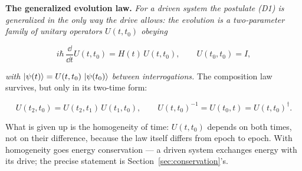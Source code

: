 \medskip\noindent\textbf{The generalized evolution law.} \emph{For a driven system the postulate \textup{(D1)} is generalized in the only way the drive allows: the evolution is a two-parameter family of unitary operators $U(t, t_0)$ obeying}
\begin{linenomath}
    \begin{equation}
        i\hbar\,\frac{\dd}{\dd t}U(t, t_0) = H(t)\,U(t, t_0), \qquad U(t_0, t_0) = I,
        \label{eq:schroedinger-timedep}
    \end{equation}
\end{linenomath}
\emph{with $\ket{\psi(t)} = U(t, t_0)\,\ket{\psi(t_0)}$ between interrogations.} The composition law survives, but only in its two-time form:
\begin{linenomath}
    \begin{equation*}
        U(t_2, t_0) = U(t_2, t_1)\,U(t_1, t_0), \qquad U(t, t_0)^{-1} = U(t_0, t) = U(t, t_0)^\dagger .
    \end{equation*}
\end{linenomath}
What is given up is the homogeneity of time: $U(t, t_0)$ depends on both times, not on their difference, because the law itself differs from epoch to epoch. With homogeneity goes energy conservation --- a driven system exchanges energy with its drive; the precise statement is Section~\ref{sec:conservation}'s.

